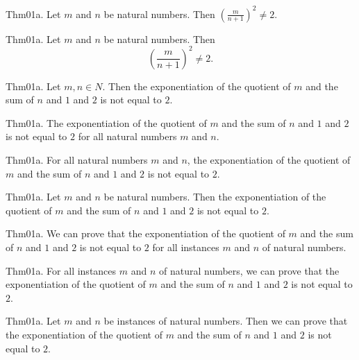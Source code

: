 \documentclass{article}
\begin{document}
Thm01a. Let $m$ and $n$ be natural numbers. Then $(\frac{ m}{n + 1})^ {2}\neq 2$.

Thm01a. Let $m$ and $n$ be natural numbers. Then $$(\frac{ m}{n + 1})^ {2}\neq 2.$$

Thm01a. Let $m , n \in N$. Then the exponentiation of the quotient of $m$ and the sum of $n$ and $1$ and $2$ is not equal to $2$.

Thm01a. The exponentiation of the quotient of $m$ and the sum of $n$ and $1$ and $2$ is not equal to $2$ for all natural numbers $m$ and $n$.

Thm01a. For all natural numbers $m$ and $n$, the exponentiation of the quotient of $m$ and the sum of $n$ and $1$ and $2$ is not equal to $2$.

Thm01a. Let $m$ and $n$ be natural numbers. Then the exponentiation of the quotient of $m$ and the sum of $n$ and $1$ and $2$ is not equal to $2$.

Thm01a. We can prove that the exponentiation of the quotient of $m$ and the sum of $n$ and $1$ and $2$ is not equal to $2$ for all instances $m$ and $n$ of natural numbers.

Thm01a. For all instances $m$ and $n$ of natural numbers, we can prove that the exponentiation of the quotient of $m$ and the sum of $n$ and $1$ and $2$ is not equal to $2$.

Thm01a. Let $m$ and $n$ be instances of natural numbers. Then we can prove that the exponentiation of the quotient of $m$ and the sum of $n$ and $1$ and $2$ is not equal to $2$.
\end{document}
